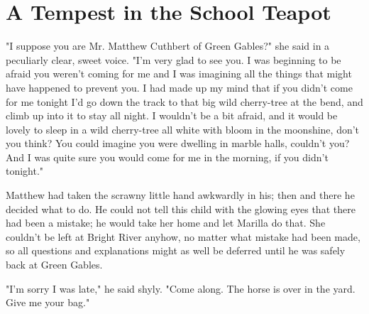 \documentclass{article}
\begin{document}
\section{A Tempest in the School Teapot}
"I suppose you are Mr. Matthew Cuthbert of Green Gables?" she said in a peculiarly clear, sweet voice. "I'm very glad to see you. I was beginning to be afraid you weren't coming for me and I was imagining all the things that might have happened to prevent you. I had made up my mind that if you didn't come for me tonight I'd go down the track to that big wild cherry-tree at the bend, and climb up into it to stay all night. I wouldn't be a bit afraid, and it would be lovely to sleep in a wild cherry-tree all white with bloom in the moonshine, don't you think? You could imagine you were dwelling in marble halls, couldn't you? And I was quite sure you would come for me in the morning, if you didn't tonight."

Matthew had taken the scrawny little hand awkwardly in his; then and there he decided what to do. He could not tell this child with the glowing eyes that there had been a mistake; he would take her home and let Marilla do that. She couldn't be left at Bright River anyhow, no matter what mistake had been made, so all questions and explanations might as well be deferred until he was safely back at Green Gables.

"I'm sorry I was late," he said shyly. "Come along. The horse is over in the yard. Give me your bag."
\end{document}
